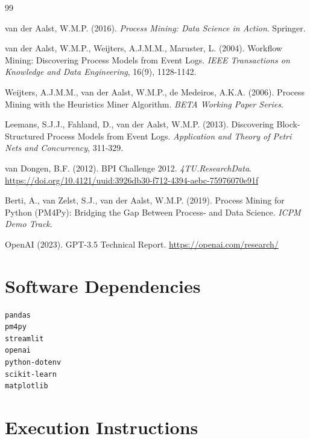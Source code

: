 \documentclass[a4paper,twoside,12pt]{article}
\begin{document}
\begin{thebibliography}{99}

van der Aalst, W.M.P. (2016). \textit{Process Mining: Data Science in Action}. Springer.

van der Aalst, W.M.P., Weijters, A.J.M.M., Maruster, L. (2004). Workflow Mining: Discovering Process Models from Event Logs. \textit{IEEE Transactions on Knowledge and Data Engineering}, 16(9), 1128-1142.

Weijters, A.J.M.M., van der Aalst, W.M.P., de Medeiros, A.K.A. (2006). Process Mining with the Heuristics Miner Algorithm. \textit{BETA Working Paper Series}.

Leemans, S.J.J., Fahland, D., van der Aalst, W.M.P. (2013). Discovering Block-Structured Process Models from Event Logs. \textit{Application and Theory of Petri Nets and Concurrency}, 311-329.

van Dongen, B.F. (2012). BPI Challenge 2012. \textit{4TU.ResearchData}. \url{https://doi.org/10.4121/uuid:3926db30-f712-4394-aebc-75976070e91f}

Berti, A., van Zelst, S.J., van der Aalst, W.M.P. (2019). Process Mining for Python (PM4Py): Bridging the Gap Between Process- and Data Science. \textit{ICPM Demo Track}.

OpenAI (2023). GPT-3.5 Technical Report. \url{https://openai.com/research/}

\end{thebibliography}

\appendix

\section{Software Dependencies}

\begin{lstlisting}[language=bash,caption={requirements.txt}]
pandas
pm4py
streamlit
openai
python-dotenv
scikit-learn
matplotlib
\end{lstlisting}

\section{Execution Instructions}
\end{document}
